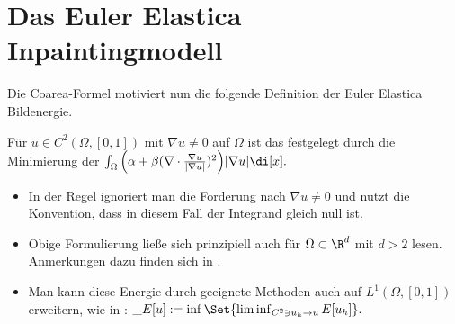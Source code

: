 \documentclass{mythesis}
\begin{document}
\section{Das Euler Elastica Inpaintingmodell}


Die Coarea-Formel motiviert nun die folgende Definition der Euler Elastica Bildenergie.

\begin{definition} \label{def:eemodel}
    Für $u \in C^2(\Omega, [0,1])$ mit $\nabla u \neq 0$ auf $\Omega$ ist das  festgelegt durch die Minimierung der 
    \begin{math}
	\int_\Omega \Big(\alpha + \beta (\nabla \cdot \frac{\nabla u}{|\nabla u|})^2\Big)|\nabla u| \di[x].
    \end{math}
    \begin{note}
	\begin{itemize}
	    \item
		In der Regel ignoriert man die Forderung nach $\nabla u \neq 0$ und nutzt die Konvention, dass in diesem Fall der Integrand gleich null ist.
	    \item
		Obige Formulierung ließe sich prinzipiell auch für $\Omega \subset \R^d$ mit $d > 2$ lesen.
		Anmerkungen dazu finden sich in \cite{ambrosio2003direct}.
	    \item
		Man kann diese Energie durch geeignete Methoden auch auf $L^1(\Omega, [0,1])$ erweitern, wie in \cite{ambrosio2003direct}:
		\begin{math}
		    \_E[u] := \inf \Set{ \liminf_{C^2 \ni u_h \to u} E[u_h] }.
		\end{math}
	\end{itemize}
    \end{note}
\end{definition}
\end{document}
